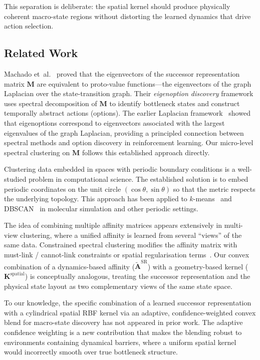 This separation is deliberate: the spatial kernel should produce
physically coherent macro-state regions without distorting the learned
dynamics that drive action selection.

\subsection{Related Work}

Machado et~al.~\autocite{machado2018eigenoption} proved that the
eigenvectors of the successor representation matrix $\mathbf{M}$ are
equivalent to proto-value functions---the eigenvectors of the graph
Laplacian over the state-transition graph.  Their \emph{eigenoption
discovery} framework uses spectral decomposition of $\mathbf{M}$ to
identify bottleneck states and construct temporally abstract actions
(options).  The earlier Laplacian framework~\autocite{machado2017laplacian}
showed that eigenoptions correspond to eigenvectors associated with the
largest eigenvalues of the graph Laplacian, providing a principled
connection between spectral methods and option discovery in reinforcement
learning.  Our micro-level spectral clustering on $\mathbf{M}$ follows
this established approach directly.

Clustering data embedded in spaces with periodic boundary conditions is a
well-studied problem in computational science.  The established solution
is to embed periodic coordinates on the unit circle
$(\cos\theta, \sin\theta)$ so that the metric respects the underlying
topology.  This approach has been applied to
$k$-means~\autocite{gao2022kmeans} and
DBSCAN~\autocite{lazzari2025dbscan} in molecular simulation and other
periodic settings.

The idea of combining multiple affinity matrices appears extensively in
multi-view clustering, where a unified affinity is learned from several
``views'' of the same data.  Constrained spectral clustering modifies the
affinity matrix with must-link / cannot-link constraints or spatial
regularisation terms~\autocite{vonluxburg2007tutorial}.  Our convex
combination of a dynamics-based affinity
($\widetilde{\mathbf{A}}^{\text{SR}}$) with a geometry-based kernel
($\mathbf{K}^{\text{spatial}}$) is conceptually analogous, treating the
successor representation and the physical state layout as two
complementary views of the same state space.

To our knowledge, the specific combination of a learned successor
representation with a cylindrical spatial RBF kernel via an adaptive,
confidence-weighted convex blend for macro-state discovery has not
appeared in prior work.  The adaptive confidence weighting is a new
contribution that makes the blending robust to environments containing
dynamical barriers, where a uniform spatial kernel would incorrectly
smooth over true bottleneck structure.
